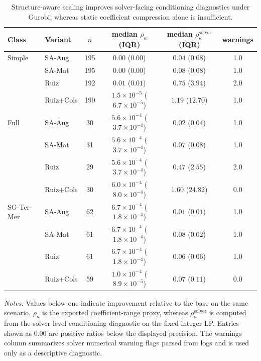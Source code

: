 \documentclass[AMA,Times1COL]{WileyNJDv5} %
\newcommand{\methodAug}{SA-Aug}
\newcommand{\methodMat}{SA-Mat}
\newcommand{\methodRuiz}{Ruiz}
\newcommand{\methodRuizCols}{Ruiz+Cols}
\providecommand{\DIFaddbegin}{} %
\providecommand{\DIFaddend}{} %
\providecommand{\DIFdelend}{} %
\begin{document}
\DIFdelend \DIFaddbegin \begin{table}[t]
\centering
\caption{Structure-aware scaling improves solver-facing conditioning diagnostics under Gurobi, whereas static coefficient compression alone is insufficient.}
\label{tab:gurobi-gap0001-relative-conditioning}
\footnotesize
\begin{tabular}{@{}ll S[table-format=3.0] c c S[table-format=1.1] @{}}
\toprule
Class & Variant & {$n$} & {median $\rho_\kappa$ (IQR)} & {median $\rho_\kappa^{\mathrm{solver}}$ (IQR)} & {warnings} \\
\midrule
Simple & \methodAug & 195 & $0.00$ ($0.00$) & $0.04$ ($0.08$) & 1.0 \\
 & \methodMat & 195 & $0.00$ ($0.00$) & $0.08$ ($0.08$) & 1.0 \\
 & \methodRuiz & 192 & $0.01$ ($0.01$) & $0.75$ ($3.94$) & 2.0 \\
 & \methodRuizCols & 190 & $1.5\times10^{-5}$ ($6.7\times10^{-5}$) & $1.19$ ($12.70$) & 1.0 \\
\addlinespace
Full & \methodAug & 30 & $5.6\times10^{-4}$ ($3.7\times10^{-4}$) & $0.02$ ($0.04$) & 1.0 \\
 & \methodMat & 31 & $5.6\times10^{-4}$ ($3.7\times10^{-4}$) & $0.07$ ($0.08$) & 1.0 \\
 & \methodRuiz & 29 & $5.6\times10^{-4}$ ($3.7\times10^{-4}$) & $0.47$ ($2.55$) & 2.0 \\
 & \methodRuizCols & 30 & $6.0\times10^{-4}$ ($8.0\times10^{-4}$) & $1.60$ ($24.82$) & 0.0 \\
\addlinespace
SG-Ter-Mer & \methodAug & 62 & $6.7\times10^{-4}$ ($1.8\times10^{-4}$) & $0.01$ ($0.01$) & 1.0 \\
 & \methodMat & 61 & $6.7\times10^{-4}$ ($1.8\times10^{-4}$) & $0.08$ ($0.02$) & 1.0 \\
 & \methodRuiz & 61 & $6.7\times10^{-4}$ ($1.8\times10^{-4}$) & $0.06$ ($0.06$) & 1.0 \\
 & \methodRuizCols & 59 & $1.0\times10^{-4}$ ($8.9\times10^{-5}$) & $0.07$ ($0.11$) & 0.0 \\
\bottomrule
\end{tabular}
\begin{flushleft}\footnotesize
\emph{Notes.} Values below one indicate improvement relative to the base on the same
scenario. $\rho_\kappa$ is the exported coefficient-range proxy, whereas
$\rho_\kappa^{\mathrm{solver}}$ is computed from the solver-level conditioning diagnostic
on the fixed-integer LP. Entries shown as $0.00$ are positive ratios below the displayed
precision. The warnings column summarizes solver numerical warning flags parsed from
logs and is used only as a descriptive diagnostic.
\end{flushleft}
\end{table}
\DIFaddend 
\end{document}
